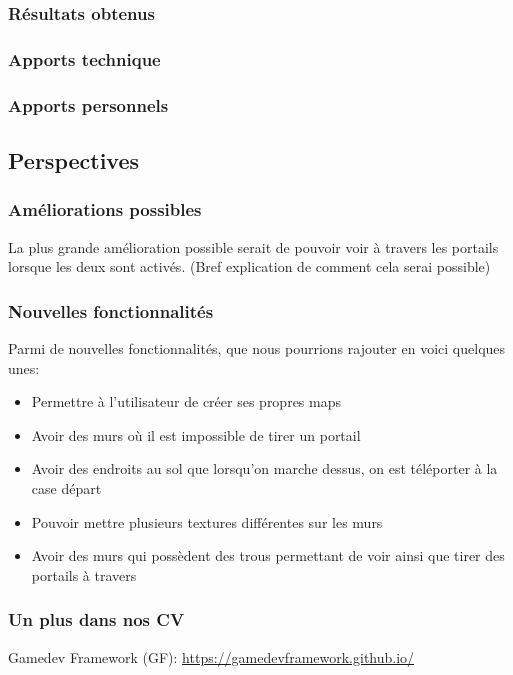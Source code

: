 \documentclass[12pt]{report}
\begin{document}
\subsubsection{Résultats obtenus}
\subsubsection{Apports technique}
\subsubsection{Apports personnels}

\subsection{Perspectives}
\subsubsection{Améliorations possibles}

La plus grande amélioration possible serait de pouvoir voir à travers les portails
lorsque les deux sont activés. (Bref explication de comment cela serai possible)

\subsubsection{Nouvelles fonctionnalités}

Parmi de nouvelles fonctionnalités, que nous pourrions rajouter en voici quelques unes:
\begin{itemize}
	\item Permettre à l'utilisateur de créer ses propres maps
	\item Avoir des murs où il est impossible de tirer un portail
	\item Avoir des endroits au sol que lorsqu'on marche dessus, on est téléporter à la case départ
	\item Pouvoir mettre plusieurs textures différentes sur les murs
	\item Avoir des murs qui possèdent des trous permettant de voir ainsi que tirer des portails à travers
\end{itemize}

\subsubsection{Un plus dans nos CV}
\cite{exemple}




Gamedev Framework (GF): \href{https://gamedevframework.github.io/}{https://gamedevframework.github.io/}
\end{document}
